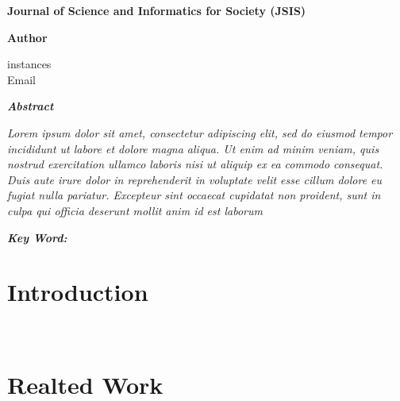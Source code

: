 \documentclass[12pt]{article}
\newcommand{\headingfont}{\rmfamily}
\begin{document}
\begin{center}
{\headingfont\fontsize{18}{22}\selectfont\textbf{Journal of Science and Informatics for Society (JSIS)}}
\end{center}

\begin{center}
\headingfont\textbf{Author}

instances\\
Email
\end{center}

\begin{center}
\headingfont\textbf{\textit{Abstract}}
\end{center}

\doublespacing
\noindent
\textit{Lorem ipsum dolor sit amet, consectetur adipiscing elit, sed do eiusmod tempor incididunt ut labore et dolore magna aliqua. Ut enim ad minim veniam, quis nostrud exercitation ullamco laboris nisi ut aliquip ex ea commodo consequat. Duis aute irure dolor in reprehenderit in voluptate velit esse cillum dolore eu fugiat nulla pariatur. Excepteur sint occaecat cupidatat non proident, sunt in culpa qui officia deserunt mollit anim id est laborum}

\noindent

\textit{{\headingfont\textbf{Key Word:}} }

\singlespacing
\section*{\headingfont Introduction}
\lipsum[1-2]
\\

\section*{\headingfont Realted Work}
\lipsum[3-4]
\\





\end{document}
